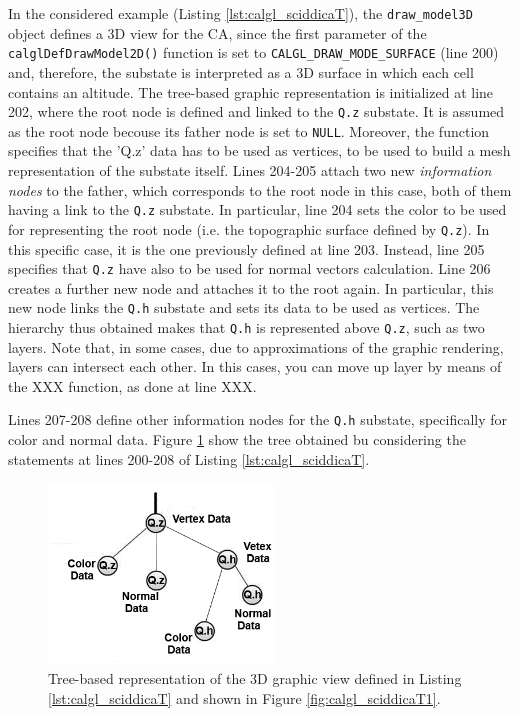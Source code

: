 In the considered example (Listing \ref{lst:calgl_sciddicaT}), the
\verb'draw_model3D' object defines a 3D view for the CA, since the
first parameter of the \verb'calglDefDrawModel2D()' function is set to
\verb'CALGL_DRAW_MODE_SURFACE' (line 200) and, therefore, the substate
is interpreted as a 3D surface in which each cell contains an
altitude. The tree-based graphic representation is initialized at line
202, where the root node is defined and linked to the \verb'Q.z'
substate. It is assumed as the root node becouse its father node is
set to \verb'NULL'. Moreover, the function specifies that the 'Q.z'
data has to be used as vertices, to be used to build a mesh
representation of the substate itself. Lines 204-205 attach two new
\emph{information nodes} to the father, which corresponds to the root
node in this case, both of them having a link to the \verb'Q.z'
substate. In particular, line 204 sets the color to be used for
representing the root node (i.e. the topographic surface defined by
\verb'Q.z'). In this specific case, it is the one previously defined
at line 203. Instead, line 205 specifies that \verb'Q.z' have also to
be used for normal vectors calculation. Line 206 creates a further new
node and attaches it to the root again. In particular, this new node
links the \verb'Q.h' substate and sets its data to be used as
vertices. The hierarchy thus obtained makes that \verb'Q.h' is
represented above \verb'Q.z', such as two layers. Note that, in some
cases, due to approximations of the graphic rendering, layers can
intersect each other. In this cases, you can move up layer by means of
the XXX function, as done at line XXX.

Lines 207-208 define
other information nodes for the \verb'Q.h' substate, specifically for
color and normal data. Figure \ref{fig:opencal_gl_tree_example} show
the tree obtained bu considering the statements at lines 200-208 of
Listing \ref{lst:calgl_sciddicaT}.

\begin{figure}
  \begin{center}
    \includegraphics[width=6cm]{./images/OpenCAL/calgl_sciddicaT_tree_model}
    \caption{Tree-based representation of the 3D graphic view defined
      in Listing \ref{lst:calgl_sciddicaT} and shown in Figure
      \ref{fig:calgl_sciddicaT1}.}
    \label{fig:opencal_gl_tree_example}
  \end{center}
\end{figure}

